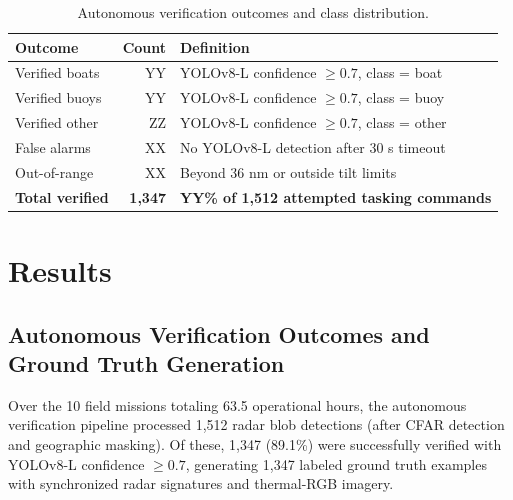 \documentclass[conf]{asmeconf}
\begin{document}
\begin{table}[t]
\caption{Autonomous verification outcomes and class distribution.}
\label{tab:verification_outcomes}
\centering
\small
\begin{tabular}{@{}lrp{3cm}@{}}
\toprule
Outcome & Count & Definition \\
\midrule
Verified boats & YY & YOLOv8-L confidence $\geq 0.7$, class = boat \\
\midrule
Verified buoys & YY & YOLOv8-L confidence $\geq 0.7$, class = buoy \\
\midrule
Verified other & ZZ & YOLOv8-L confidence $\geq 0.7$, class = other \\
\midrule
False alarms & XX & No YOLOv8-L detection after 30 s timeout \\
\midrule
Out-of-range & XX & Beyond 36 nm or outside tilt limits \\
\midrule
\textbf{Total verified} & \textbf{1,347} & \textbf{YY\% of 1,512 attempted tasking commands} \\
\bottomrule
\end{tabular}
\end{table}

\section{Results}

\subsection{Autonomous Verification Outcomes and Ground Truth Generation}

Over the 10 field missions totaling 63.5 operational hours, the autonomous verification pipeline processed 1,512 radar blob detections (after CFAR detection and geographic masking). Of these, 1,347 (89.1\%) were successfully verified with YOLOv8-L confidence $\geq 0.7$, generating 1,347 labeled ground truth examples with synchronized radar signatures and thermal-RGB imagery.
\end{document}
